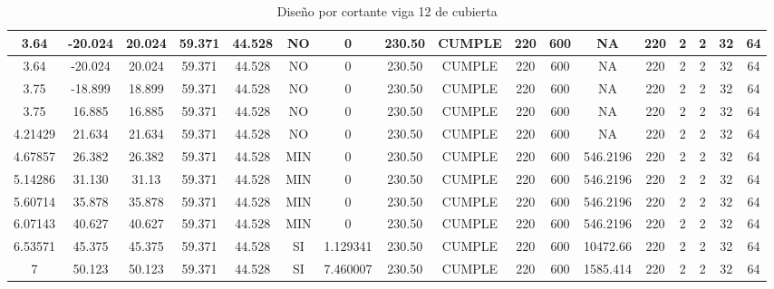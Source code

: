 \begin{table}[H]
{\begin{tabular}{|c|c|c|c|c|c|c|c|c|c|c|c|c|c|c|c|c|}
    \hline
    3.64  & -20.024 & 20.024 & 59.371 & 44.528 & NO    & 0     & 230.50 & CUMPLE & 220   & 600   & NA    & 220   & 2     & 2     & 32    & 64 \bigstrut\\
    \hline
    3.64  & -20.024 & 20.024 & 59.371 & 44.528 & NO    & 0     & 230.50 & CUMPLE & 220   & 600   & NA    & 220   & 2     & 2     & 32    & 64 \bigstrut\\
    \hline
    3.75  & -18.899 & 18.899 & 59.371 & 44.528 & NO    & 0     & 230.50 & CUMPLE & 220   & 600   & NA    & 220   & 2     & 2     & 32    & 64 \bigstrut\\
    \hline
    3.75  & 16.885 & 16.885 & 59.371 & 44.528 & NO    & 0     & 230.50 & CUMPLE & 220   & 600   & NA    & 220   & 2     & 2     & 32    & 64 \bigstrut\\
    \hline
    4.21429 & 21.634 & 21.634 & 59.371 & 44.528 & NO    & 0     & 230.50 & CUMPLE & 220   & 600   & NA    & 220   & 2     & 2     & 32    & 64 \bigstrut\\
    \hline
    4.67857 & 26.382 & 26.382 & 59.371 & 44.528 & MIN   & 0     & 230.50 & CUMPLE & 220   & 600   & 546.2196 & 220   & 2     & 2     & 32    & 64 \bigstrut\\
    \hline
    5.14286 & 31.130 & 31.13 & 59.371 & 44.528 & MIN   & 0     & 230.50 & CUMPLE & 220   & 600   & 546.2196 & 220   & 2     & 2     & 32    & 64 \bigstrut\\
    \hline
    5.60714 & 35.878 & 35.878 & 59.371 & 44.528 & MIN   & 0     & 230.50 & CUMPLE & 220   & 600   & 546.2196 & 220   & 2     & 2     & 32    & 64 \bigstrut\\
    \hline
    6.07143 & 40.627 & 40.627 & 59.371 & 44.528 & MIN   & 0     & 230.50 & CUMPLE & 220   & 600   & 546.2196 & 220   & 2     & 2     & 32    & 64 \bigstrut\\
    \hline
    6.53571 & 45.375 & 45.375 & 59.371 & 44.528 & SI    & 1.129341 & 230.50 & CUMPLE & 220   & 600   & 10472.66 & 220   & 2     & 2     & 32    & 64 \bigstrut\\
    \hline
    7     & 50.123 & 50.123 & 59.371 & 44.528 & SI    & 7.460007 & 230.50 & CUMPLE & 220   & 600   & 1585.414 & 220   & 2     & 2     & 32    & 64 \bigstrut\\
    \hline
    \end{tabular}}%
  \caption{Diseño por cortante viga 12 de cubierta}
  \label{tab:Cort V12C}%
\end{table}%
